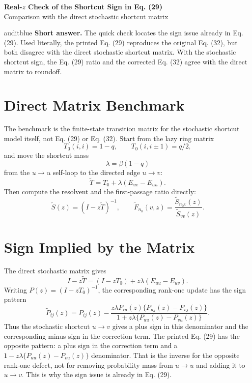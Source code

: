 \documentclass[11pt]{article}
\begin{document}
\begin{center}
{\Large\bfseries Real-\(z\) Check of the Shortcut Sign in Eq. (29)}\\[0.3em]
{\small Comparison with the direct stochastic shortcut matrix}
\end{center}

\begin{resultbox}{auditblue}
\textbf{Short answer.}
The quick check locates the sign issue already in Eq. (29).  Used literally,
the printed Eq. (29) reproduces the original Eq. (32), but both disagree with
the direct stochastic shortcut matrix.  With the stochastic shortcut sign, the
Eq. (29) ratio and the corrected Eq. (32) agree with the direct matrix to
roundoff.
\end{resultbox}

\section*{Direct Matrix Benchmark}

The benchmark is the finite-state transition matrix for the stochastic shortcut
model itself, not Eq. (29) or Eq. (32).  Start from the lazy ring matrix
\[
T_0(i,i)=1-q,\qquad T_0(i,i\pm1)=q/2,
\]
and move the shortcut mass
\[
\lambda=\beta(1-q)
\]
from the \(u\to u\) self-loop to the directed edge \(u\to v\):
\[
\widetilde T=T_0+\lambda(E_{uv}-E_{uu}).
\]
Then compute the resolvent and the first-passage ratio directly:
\[
\widetilde S(z)=(I-z\widetilde T)^{-1},\qquad
\widetilde F_{n_0}(v,z)=
\frac{\widetilde S_{n_0v}(z)}{\widetilde S_{vv}(z)}.
\]

\section*{Sign Implied by the Matrix}

The direct stochastic matrix gives
\[
I-z\widetilde T=(I-zT_0)+z\lambda(E_{uu}-E_{uv}).
\]
Writing \(P(z)=(I-zT_0)^{-1}\), the corresponding rank-one update has the
sign pattern
\[
\widetilde P_{ij}(z)
=P_{ij}(z)
-\frac{z\lambda P_{iu}(z)\{P_{uj}(z)-P_{vj}(z)\}}
{1+z\lambda\{P_{uu}(z)-P_{vu}(z)\}}.
\]
Thus the stochastic shortcut \(u\to v\) gives a plus sign in this denominator
and the corresponding minus sign in the correction term.  The printed Eq. (29)
has the opposite pattern: a plus sign in the correction term and a
\(1-z\lambda\{P_{uu}(z)-P_{vu}(z)\}\) denominator.  That is the inverse for the
opposite rank-one defect, not for removing probability mass from \(u\to u\) and
adding it to \(u\to v\).  This is why the sign issue is already in Eq. (29).
\end{document}
